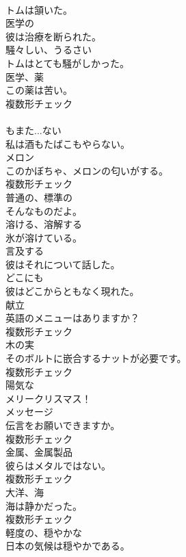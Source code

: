 \documentclass[8pt]{extreport}
\begin{document}
\begin{CJK}{UTF8}{min}
\\	トムは頷いた。	
\\	[形容詞]	医学の	
\\	彼は治療を断られた。	
\\	[形容詞]	騒々しい、うるさい	
\\	トムはとても騒がしかった。	
\\	[名詞]	医学、薬	
\\	この薬は苦い。	
\\	複数形チェック
\\	[接続詞]	
\\	もまた...ない	
\\	私は酒もたばこもやらない。	
\\	[名詞]	メロン	
\\	このかぼちゃ、メロンの匂いがする。	
\\	複数形チェック
\\	[形容詞]	普通の、標準の	
\\	そんなものだよ。	
\\	[動詞]	溶ける、溶解する	
\\	氷が溶けている。	
\\	[動詞]	言及する	
\\	彼はそれについて話した。	
\\	[副詞]	どこにも	
\\	彼はどこからともなく現れた。	
\\	[名詞]	献立	
\\	英語のメニューはありますか？	
\\	複数形チェック
\\	[名詞]	木の実	
\\	そのボルトに嵌合するナットが必要です。	
\\	複数形チェック
\\	[形容詞]	陽気な	
\\	メリークリスマス！	
\\	[名詞]	メッセージ	
\\	伝言をお願いできますか。	
\\	複数形チェック
\\	[名詞]	金属、金属製品	
\\	彼らはメタルではない。	
\\	複数形チェック
\\	[名詞]	大洋、海	
\\	海は静かだった。	
\\	複数形チェック
\\	[形容詞]	軽度の、穏やかな	
\\	日本の気候は穏やかである。	

\end{CJK}
\end{document}
